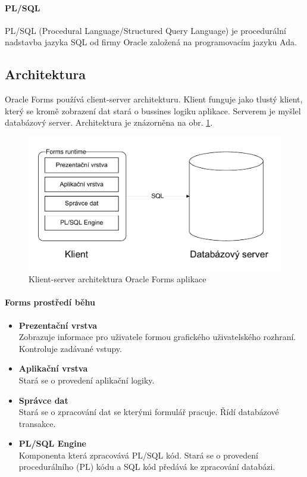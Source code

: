 \documentclass{diplomka}
\begin{document}
\paragraph{PL/SQL}
PL/SQL (Procedural Language/Structured Query Language) je procedurální nadstavba jazyka SQL od firmy Oracle založená na programovacím jazyku Ada.
\newpage
\subsection{Architektura}
Oracle Forms používá client-server architekturu. Klient funguje jako tlustý klient, který se kromě zobrazení dat stará o bussines logiku aplikace. Serverem je myšlel databázový server. Architektura je znázorněna na obr. \ref{fig:arch}.

\begin{figure}[H]
  \centering
  \includegraphics[scale=0.7]{visio/arch.pdf}
\caption{Klient-server architektura Oracle Forms aplikace}
\label{fig:arch}
\end{figure}
\paragraph{Forms prostředí běhu}
\begin{itemize}[noitemsep,nolistsep]
\item \textbf{Prezentační vrstva}\\
Zobrazuje informace pro uživatele formou grafického uživatelského rozhraní. Kontroluje zadávané vstupy.
\item \textbf{Aplikační vrstva}\\
Stará se o provedení aplikační logiky.
\item \textbf{Správce dat}\\
Stará se o zpracování dat se kterými formulář pracuje. Řídí databázové transakce.
\item \textbf{PL/SQL Engine}\\
Komponenta která zpracovává PL/SQL kód. Stará se o provedení procedurálního (PL) kódu a SQL kód předává ke zpracování databázi.
\end{itemize}
\end{document}
